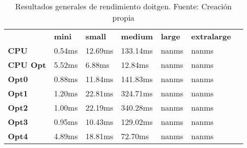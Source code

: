 \begin{table}[H]
    \centering
    \begin{tabular}{lllllll}
    \rowcolor[HTML]{DAE8FC} \ &  \textbf{mini} &  \textbf{small} &  \textbf{medium} &  \textbf{	large} &  \textbf{	extralarge} \\
    \cellcolor[HTML]{DAE8FC} \textbf{CPU} & 0.54ms & 12.69ms & 133.14ms & 	nanms & 	nanms \\
    \rowcolor[HTML]{EFEFEF} \cellcolor[HTML]{DAE8FC} \textbf{CPU Opt} & 5.52ms & 6.88ms & 12.84ms & 	nanms & 	nanms \\
    \cellcolor[HTML]{DAE8FC} \textbf{Opt0} & 0.88ms & 11.84ms & 141.83ms & 	nanms & 	nanms \\
    \rowcolor[HTML]{EFEFEF} \cellcolor[HTML]{DAE8FC} \textbf{Opt1} & 1.20ms & 22.81ms & 324.71ms & 	nanms & 	nanms \\
    \cellcolor[HTML]{DAE8FC} \textbf{Opt2} & 1.00ms & 22.19ms & 340.28ms & 	nanms & 	nanms \\
    \rowcolor[HTML]{EFEFEF} \cellcolor[HTML]{DAE8FC} \textbf{Opt3} & 0.95ms & 10.43ms & 129.02ms & 	nanms & 	nanms \\
    \cellcolor[HTML]{DAE8FC} \textbf{Opt4} & 4.89ms & 18.81ms & 72.70ms & 	nanms & 	nanms \\
    \end{tabular}
    \caption[Resultados generales de rendimiento doitgen]{{Resultados generales de rendimiento doitgen. Fuente: Creación propia}}
    \label{table_global_doitgen_PerformanceResults_data}
\end{table}